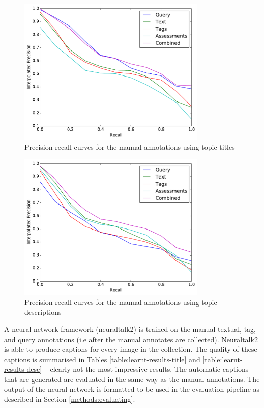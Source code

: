 \begin{figure}[ht]
    \centering
    \includegraphics[width=0.8\textwidth]{graphs/manual-title}
    \caption{Precision-recall curves for the manual annotations using topic titles}
    \label{fig:manual-result-title}
\end{figure}

\begin{figure}[ht]
    \centering
    \includegraphics[width=0.8\textwidth]{graphs/manual-desc}
    \caption{Precision-recall curves for the manual annotations using topic descriptions}
    \label{fig:manual-result-desc}
\end{figure}

\FloatBarrier

A neural network framework (neuraltalk2) is trained on the manual textual, tag, and query annotations (i.e after the manual annotates are collected). Neuraltalk2 is able to produce captions for every image in the collection. The quality of these captions is summarised in Tables \ref{table:learnt-results-title} and \ref{table:learnt-results-desc} -- clearly not the most impressive results. The automatic captions that are generated are evaluated in the same way as the manual annotations. The output of the neural network is formatted to be used in the evaluation pipeline as described in Section \ref{methods:evaluating}. 

